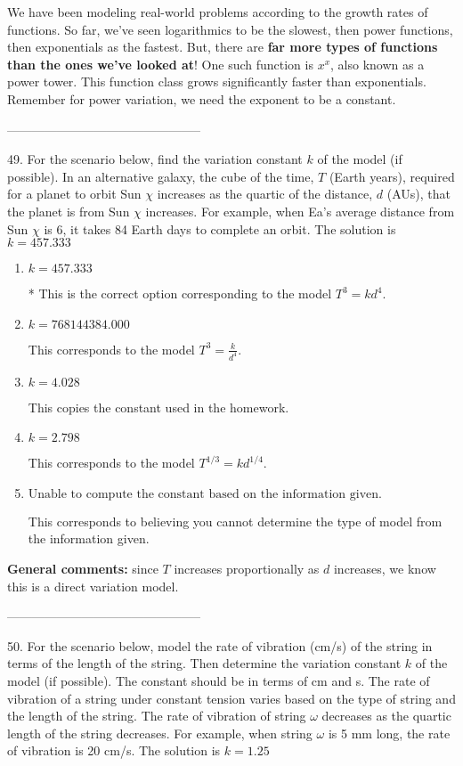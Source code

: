 \documentclass{extbook}[14pt]
\begin{document}
We have been modeling real-world problems according to the growth rates of functions. So far, we've seen logarithmics to be the slowest, then power functions, then exponentials as the fastest. But, there are \textbf{far more types of functions than the ones we've looked at}! One such function is $x^x$, also known as a power tower. This function class grows significantly faster than exponentials. Remember for power variation, we need the exponent to be a constant.

-----------------------------------------------

49. For the scenario below, find the variation constant $k$ of the model (if possible).
In an alternative galaxy, the cube of the time, $T$ (Earth years), required for a planet to orbit Sun $\chi$ increases as the quartic of the distance, $d$ (AUs), that the planet is from Sun $\chi$ increases. For example, when Ea's average distance from Sun $\chi$ is 6, it takes 84 Earth days to complete an orbit. 
The solution is $ k = 457.333 $ 

\begin{enumerate}[label=\Alph*.] 
\item $ k = 457.333 $ 

 * This is the correct option corresponding to the model $T^{3} = k d^{4}$. 
\item $ k = 768144384.000 $ 

 This corresponds to the model $T^{3} = \frac{k}{d^{4}}$. 
\item $ k = 4.028 $ 

 This copies the constant used in the homework. 
\item $ k = 2.798 $ 

 This corresponds to the model $T^{1/3} = k d^{1/4}$. 
\item $ \text{Unable to compute the constant based on the information given.} $ 

 This corresponds to believing you cannot determine the type of model from the information given. 
\end{enumerate} 
 
\textbf{General comments:} since $T$ increases proportionally as $d$ increases, we know this is a direct variation model.

-----------------------------------------------

50. For the scenario below, model the rate of vibration (cm/s) of the string in terms of the length of the string. Then determine the variation constant $k$ of the model (if possible). The constant should be in terms of cm and s.
The rate of vibration of a string under constant tension varies based on the type of string and the length of the string. The rate of vibration of string $\omega$ decreases as the quartic length of the string decreases. For example, when string $\omega$ is 5 mm long, the rate of vibration is 20 cm/s. 
The solution is $ k = 1.25 $ 
\end{document}

